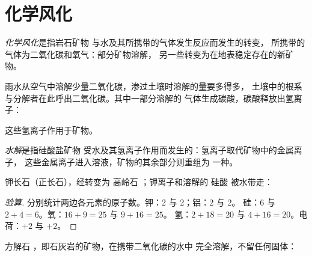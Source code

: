 \section{化学风化}

\begin{definition}[化学风化]\label{def:g10:soil-formation:chemical-weathering}
\emph{化学风化}是指岩石矿物
与水及其所携带的气体发生反应而发生的转变，
所携带的气体为二氧化碳和氧气：部分矿物溶解，
另一些转变为在地表稳定存在的新矿物。
\end{definition}

雨水从空气中溶解少量二氧化碳，渗过土壤时溶解的量要多得多，
土壤中的根系与分解者在此呼出二氧化碳。其中一部分溶解的
气体生成碳酸，碳酸释放出氢离子：
\begin{center}
\end{center}
这些氢离子作用于矿物。

\begin{definition}[水解]\label{def:g10:soil-formation:hydrolysis}
\emph{水解}是指硅酸盐矿物
受水及其氢离子作用而发生的：氢离子取代矿物中的金属离子，
这些金属离子进入溶液，矿物的其余部分则重组为
一种。
\end{definition}

\begin{proposition}[长石的水解]\label{prop:g10:soil-formation:hydrolysis}
钾长石（正长石），经转变为
高岭石 ；钾离子和溶解的
硅酸  被水带走：
\begin{center}
\end{center}
\end{proposition}

\begin{proof}[验算]
分别统计两边各元素的原子数。钾：2 与 2；铝：2 与 2。
硅：6 与 $2 + 4 = 6$。氧：$16 + 9 = 25$ 与 $9 + 16 = 25$。
氢：$2 + 18 = 20$ 与 $4 + 16 = 20$。电荷：$+2$ 与 $+2$。
\end{proof}

\begin{proposition}[方解石的溶解]\label{prop:g10:soil-formation:calcite}
方解石 ，即石灰岩的矿物，在携带二氧化碳的水中
完全溶解，不留任何固体：
\begin{center}
\end{center}
\end{proposition}

